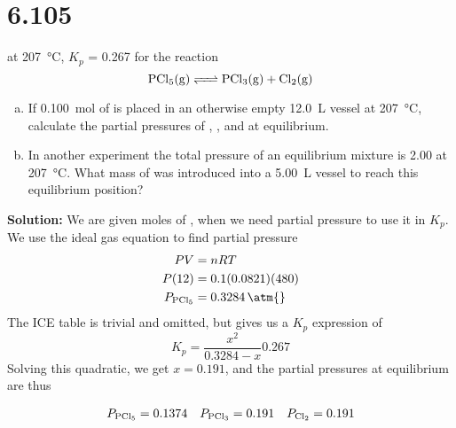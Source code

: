 \documentclass[11 pt]{article}
\begin{document}
    \section*{6.105}
    \begin{problemBox}
        at \SI{207}{\celsius}, $K_p$ = \SI{0.267}{\atm} for the reaction
        $$\ce{PCl5(g) <=> PCl3(g) + Cl2(g)}$$
        \begin{enumerate}[a)]
            \item If \SI{0.100}{\mole} of  is placed in an otherwise empty \SI{12.0}{\liter} vessel at \SI{207}{\celsius}, calculate the partial pressures of , , and  at equilibrium.
            \item In another experiment the total pressure of an equilibrium mixture is \SI{2.00}{\atm{}} at \SI{207}{\celsius}. What mass of  was introduced into a \SI{5.00}{\liter} vessel to reach this equilibrium position?
        \end{enumerate} 
    \end{problemBox}
    \textbf{Solution:} We are given moles of , when we need partial pressure to use it in $K_p$. We use the ideal gas equation to find partial pressure
    \begin{align*}
        PV &= nRT \\
        P(12) &= 0.1(0.0821)(480) \\
        P_{\ce{PCl5}} &= \SI{0.3284}{\atm{}}
    \end{align*}
    The ICE table is trivial and omitted, but gives us a $K_p$ expression of 
    $$K_p = \frac{x^2}{0.3284 - x} 0.267$$
    Solving this quadratic, we get $x = 0.191$, and the partial pressures at equilibrium are thus
    \begin{answerBox}
    \begin{align*}
        P_{\ce{PCl5}} = 0.1374 && P_{\ce{PCl3}} = 0.191 && P_{\ce{Cl2}} = 0.191
    \end{align*}
    \end{answerBox}
\end{document}
